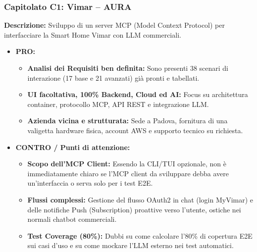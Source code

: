 \documentclass[a4paper, 11pt]{article}
\begin{document}
\subsubsection*{Capitolato C1: Vimar -- AURA}
\textbf{Descrizione:} Sviluppo di un server MCP (Model Context Protocol) per interfacciare la Smart Home Vimar con LLM commerciali.
\begin{itemize}
    \item \textbf{PRO:}
    \begin{itemize}
        \item \textbf{Analisi dei Requisiti ben definita:} Sono presenti 38 scenari di interazione (17 base e 21 avanzati) già pronti e tabellati.
        \item \textbf{UI facoltativa, 100\% Backend, Cloud ed AI:} Focus su architettura container, protocollo MCP, API REST e integrazione LLM.
        \item \textbf{Azienda vicina e strutturata:} Sede a Padova, fornitura di una valigetta hardware fisica, account AWS e supporto tecnico su richiesta.
    \end{itemize}
    \item \textbf{CONTRO / Punti di attenzione:}
    \begin{itemize}
        \item \textbf{Scopo dell'MCP Client:} Essendo la CLI/TUI opzionale, non è immediatamente chiaro se l'MCP client da sviluppare debba avere un'interfaccia o serva solo per i test E2E.
        \item \textbf{Flussi complessi:} Gestione del flusso OAuth2 in chat (login MyVimar) e delle notifiche Push (Subscription) proattive verso l'utente, ostiche nei normali chatbot commerciali.
        \item \textbf{Test Coverage (80\%):} Dubbi su come calcolare l'80\% di copertura E2E sui casi d'uso e su come mockare l'LLM esterno nei test automatici.
    \end{itemize}
\end{itemize}
\end{document}
